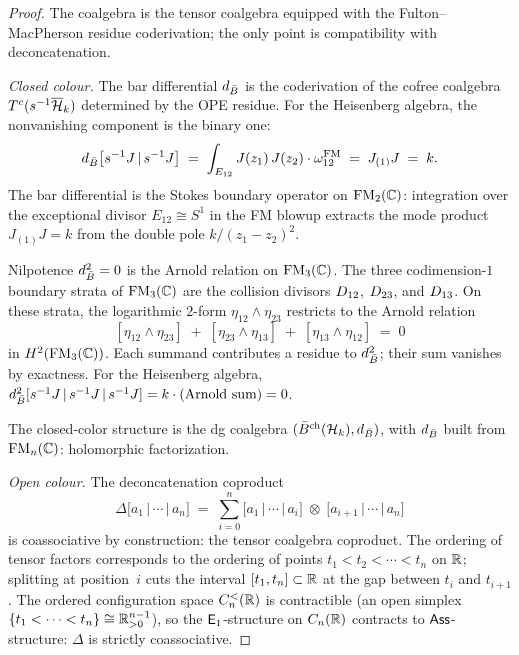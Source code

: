 \begin{proof}
The coalgebra is the tensor coalgebra equipped with the
Fulton--MacPherson residue coderivation; the only point is
compatibility with deconcatenation.

\medskip
\noindent\textit{Closed colour.}\enspace
The bar differential $d_{\bar{B}}$ is the coderivation of the cofree coalgebra $T^c(s^{-1}\overline{\mathcal{H}}_k)$ determined by the OPE residue. For the Heisenberg algebra, the nonvanishing component is the binary one:
\begin{equation}\label{eq:rosetta-dbar-binary}
d_{\bar{B}}\bigl[s^{-1}J \,|\, s^{-1}J\bigr]
\;=\;
\int_{E_{12}}
 J(z_1)\, J(z_2) \cdot \omega_{12}^{\mathrm{FM}}
\;=\;
J_{(1)}J
\;=\; k.
\end{equation}
The bar differential is the Stokes boundary operator on $\mathrm{FM}_2(\mathbb{C})$: integration over the exceptional divisor $E_{12} \cong S^1$ in the FM blowup extracts the mode product $J_{(1)}J = k$ from the double pole $k/(z_1 - z_2)^2$.

Nilpotence $d_{\bar{B}}^2 = 0$ is the Arnold relation on $\mathrm{FM}_3(\mathbb{C})$. The three codimension-$1$ boundary strata of $\mathrm{FM}_3(\mathbb{C})$ are the collision divisors $D_{12}$, $D_{23}$, and $D_{13}$. On these strata, the logarithmic $2$-form $\eta_{12} \wedge \eta_{23}$ restricts to the Arnold relation
\begin{equation}\label{eq:rosetta-arnold}
[\eta_{12} \wedge \eta_{23}]
\;+\;
[\eta_{23} \wedge \eta_{13}]
\;+\;
[\eta_{13} \wedge \eta_{12}]
\;=\; 0
\end{equation}
in $H^2(\mathrm{FM}_3(\mathbb{C}))$. Each summand contributes a residue to $d_{\bar{B}}^2$; their sum vanishes by exactness. For the Heisenberg algebra, $d_{\bar{B}}^2[s^{-1}J \,|\, s^{-1}J \,|\, s^{-1}J] = k \cdot (\text{Arnold sum}) = 0$.

The closed-color structure is the dg coalgebra $(\bar{B}^{\mathrm{ch}}(\mathcal{H}_k), d_{\bar{B}})$, with $d_{\bar{B}}$ built from $\mathrm{FM}_n(\mathbb{C})$: holomorphic factorization.

\medskip
\noindent\textit{Open colour.}\enspace
The deconcatenation coproduct
\begin{equation}\label{eq:rosetta-delta}
\Delta\bigl[a_1 \,|\, \cdots \,|\, a_n\bigr]
\;=\;
\sum_{i=0}^{n}
\bigl[a_1 \,|\, \cdots \,|\, a_i\bigr]
\;\otimes\;
\bigl[a_{i+1} \,|\, \cdots \,|\, a_n\bigr]
\end{equation}
is coassociative by construction: the tensor coalgebra coproduct. The ordering of tensor factors corresponds to the ordering of points $t_1 < t_2 < \cdots < t_n$ on $\mathbb{R}$; splitting at position~$i$ cuts the interval $[t_1, t_n] \subset \mathbb{R}$ at the gap between $t_i$ and $t_{i+1}$. The ordered configuration space $C_n^{<}(\mathbb{R})$ is contractible (an open simplex $\{t_1 < \cdots < t_n\} \cong \mathbb{R}^{n-1}_{> 0}$), so the $\mathsf{E}_1$-structure on $C_n(\mathbb{R})$ contracts to $\mathsf{Ass}$-structure: $\Delta$ is strictly coassociative.


\end{proof}
